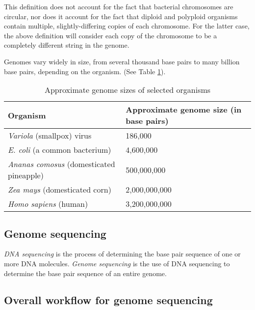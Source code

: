 \documentclass[10pt]{article}
\begin{document}
This definition does not account for the fact that bacterial chromosomes are
circular, nor does it account for the fact that diploid and polyploid organisms
contain multiple, slightly-differing copies of each chromosome.  For the latter
case, the above definition will consider each copy of the chromosome to be a
completely different string in the genome.

Genomes vary widely in size, from several thousand base pairs to many billion
base pairs, depending on the organism.  (See Table \ref{tab:GenomeSizes}).

\begin{table}[H]
	\begin{center}
		\begin{tabular}{|l|p{4.5cm}|}
			\hline
			{\bf Organism} & {\bf Approximate genome size (in base
			pairs)} \\
			\hline
			{\it Variola} (smallpox) virus &  186,000 \\
			\hline
			{\it E. coli} (a common bacterium) & 4,600,000 \\
			\hline
			{\it Ananas comosus} (domesticated pineapple) & 500,000,000 \\
			\hline
			{\it Zea mays} (domesticated corn) & 2,000,000,000 \\
			\hline
			{\it Homo sapiens} (human)       &  3,200,000,000 \\
			\hline
		\end{tabular}
	\end{center}
	\caption{Approximate genome sizes of selected organisms}
	\label{tab:GenomeSizes}
\end{table}

\subsection{Genome sequencing}

{\it DNA sequencing} is the process of determining the base pair sequence of one
or more DNA molecules.  {\it Genome sequencing} is the use of DNA sequencing to
determine the base pair sequence of an entire genome.


\subsection{Overall workflow for genome sequencing}
\end{document}

